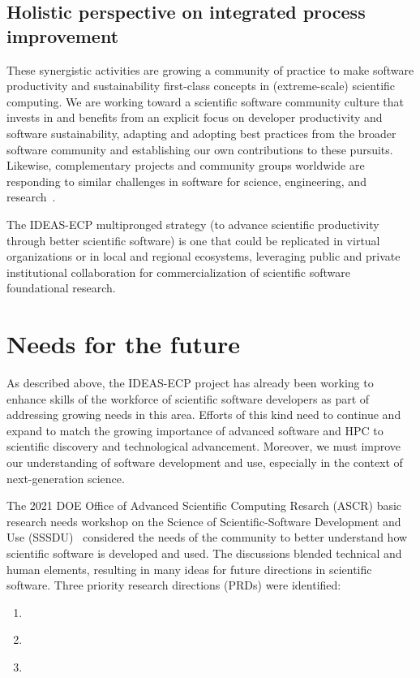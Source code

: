 \subsection*{Holistic perspective on integrated process improvement}
These synergistic activities are growing a community of practice to make software productivity and sustainability first-class concepts in (extreme-scale) scientific computing.  We are working toward a scientific software community culture that invests in and benefits from an explicit focus on developer productivity and software sustainability, adapting and adopting best practices from the broader software community and establishing our own contributions to these pursuits.  
Likewise, complementary projects and community groups worldwide are responding to similar challenges in software for science, engineering, and research~\cite{KatzMcInnesEtAl2019}.

The IDEAS-ECP multipronged strategy (to advance scientific productivity through better scientific software) is one that could be replicated in virtual organizations or in local and regional ecosystems, leveraging public and private institutional collaboration for commercialization of scientific software foundational research.


\section*{Needs for the future}

As described above, the IDEAS-ECP project has already been working to enhance skills of the workforce of scientific software developers as part of addressing growing needs in this area.  Efforts of this kind need to continue and expand to match the growing importance of advanced software and HPC to scientific discovery and technological advancement.  Moreover, we must improve our understanding of software development and use, especially in the context of next-generation science.
 
The 2021 DOE Office of Advanced Scientific Computing Resarch (ASCR) basic research needs workshop on the Science of Scientific-Software Development and Use (SSSDU)~\cite{sssdu-workshop-website2021,sssdu-workshop-brochure2022,sssdu-workshop-report2022-preliminary} considered the needs of the community to better understand how scientific software is developed and used.  The discussions blended technical and human elements, resulting in many ideas for future directions in scientific software. Three priority research directions (PRDs) were identified:
\begin{enumerate}
    \item \textbf{\PRDONE{}}
    \item \textbf{\PRDTWO{}}
    \item \textbf{\PRDTHREE{}}
\end{enumerate}

